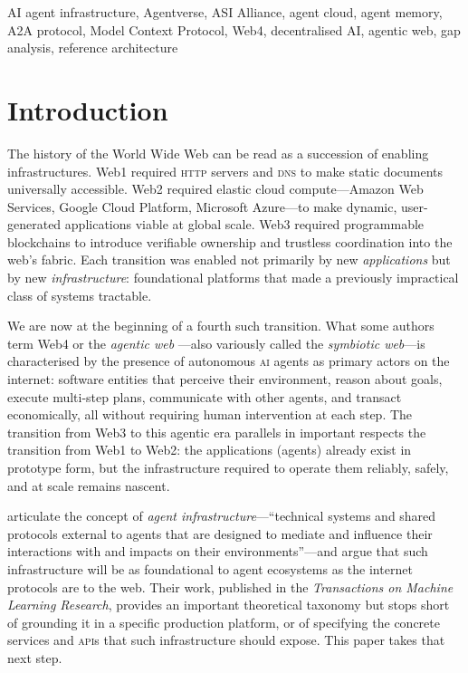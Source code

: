 \documentclass[twoside,11pt]{article}
\begin{document}
\begin{keywords}
  AI agent infrastructure, Agentverse, ASI Alliance, agent cloud, agent memory,
  A2A protocol, Model Context Protocol, Web4, decentralised AI, agentic web,
  gap analysis, reference architecture
\end{keywords}

\section{Introduction}
\label{sec:intro}

The history of the World Wide Web can be read as a succession of enabling
infrastructures.  Web1 required \textsc{http} servers and \textsc{dns} to make
static documents universally accessible.  Web2 required elastic cloud
compute---Amazon Web Services, Google Cloud Platform, Microsoft Azure---to make
dynamic, user-generated applications viable at global scale.  Web3 required
programmable blockchains to introduce verifiable ownership and trustless
coordination into the web's fabric.  Each transition was enabled not primarily
by new \emph{applications} but by new \emph{infrastructure}: foundational
platforms that made a previously impractical class of systems tractable.

We are now at the beginning of a fourth such transition.  What some authors
term Web4 or the \emph{agentic web} \citep{eph4ai2026}---also variously
called the \emph{symbiotic web}---is characterised by the presence of
autonomous \textsc{ai} agents as primary actors on the internet: software
entities that perceive their environment, reason about goals, execute
multi-step plans, communicate with other agents, and transact economically,
all without requiring human intervention at each step.  The transition from
Web3 to this agentic era parallels in important respects the transition from
Web1 to Web2: the applications (agents) already exist in prototype form, but
the infrastructure required to operate them reliably, safely, and at scale
remains nascent.

\citet{chan2025infrastructure} articulate the concept of \emph{agent
infrastructure}---``technical systems and shared protocols external to agents
that are designed to mediate and influence their interactions with and impacts
on their environments''---and argue that such infrastructure will be as
foundational to agent ecosystems as the internet protocols are to the web.
Their work, published in the \emph{Transactions on Machine Learning Research},
provides an important theoretical taxonomy but stops short of grounding it in a
specific production platform, or of specifying the concrete services and
\textsc{api}s that such infrastructure should expose.  This paper takes that
next step.
\end{document}
